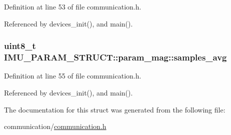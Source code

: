 Definition at line 53 of file communication.\-h.



Referenced by devices\-\_\-init(), and main().

\hypertarget{structIMU__PARAM__STRUCT_1_1param__mag_a52c22cae6940eb39fb72aca66cfeba9a}{
\subsubsection[{samples\-\_\-avg}]{\setlength{\rightskip}{0pt plus 5cm}uint8\-\_\-t I\-M\-U\-\_\-\-P\-A\-R\-A\-M\-\_\-\-S\-T\-R\-U\-C\-T\-::param\-\_\-mag\-::samples\-\_\-avg}}\label{structIMU__PARAM__STRUCT_1_1param__mag_a52c22cae6940eb39fb72aca66cfeba9a}


Definition at line 55 of file communication.\-h.



Referenced by devices\-\_\-init(), and main().



The documentation for this struct was generated from the following file\-:\begin{DoxyCompactItemize}
\item 
communication/\hyperlink{communication_8h}{communication.\-h}\end{DoxyCompactItemize}
